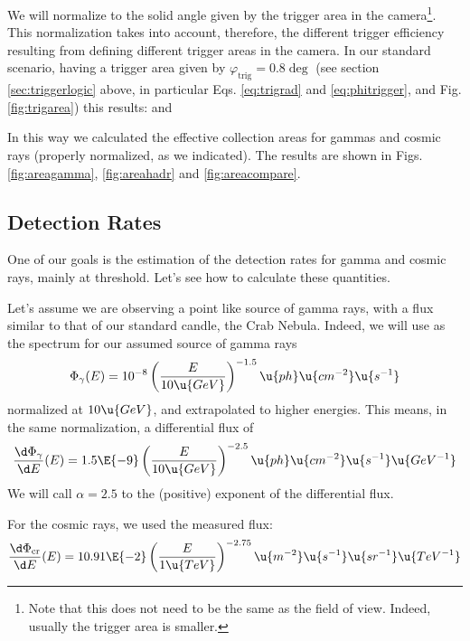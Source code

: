 We will normalize to the solid angle given by the trigger area in the
camera\footnote{ Note that this does not need to be the same as the
  field of view. Indeed, usually the trigger area is smaller.}. This
normalization takes into account, therefore, the different trigger
efficiency resulting from defining different trigger areas in the
camera. In our standard scenario, having a trigger area given by
$\varphi_{\mathrm{trig}} = 0.8\deg$ (see section
\ref{sec:triggerlogic} above, in particular Eqs.  \ref{eq:trigrad} and
\ref{eq:phitrigger}, and Fig. \ref{fig:trigarea}) this results:
%
\normsolidangleeq
%
and 
%
\Scrnormeq

In this way we calculated the effective collection areas for gammas
and cosmic rays (properly normalized, as we indicated). The results
are shown in Figs. \ref{fig:areagamma}, \ref{fig:areahadr} and
\ref{fig:areacompare}.

\MORE%

\subsection{Detection Rates}

One of our goals is the estimation of the detection rates for gamma
and cosmic rays, mainly at threshold. Let's see how to calculate these
quantities.

Let's assume we are observing a point like source of gamma rays, with
a flux similar to that of our standard candle, the Crab Nebula.
Indeed, we will use as the spectrum for our assumed source of gamma
rays
%
\begin{equation}
  \label{eq:gFlux}
  \Phi_\gamma(E) = 
  10^{-8} \left(\frac{E}{10\u{GeV}}\right)^{-1.5} 
  \u{ph}\u{cm^{-2}}\u{s^{-1}}
\end{equation}
%
normalized at $10\u{GeV}$, and extrapolated to higher energies.
This means, in the same normalization, a differential flux of
%
\begin{equation}
  \label{eq:gdFlux}
  \frac{\d\Phi_\gamma}{\d E}(E) = 
  1.5\E{-9} \left(\frac{E}{10\u{GeV}}\right)^{-2.5} 
  \u{ph}\u{cm^{-2}}\u{s^{-1}}\u{GeV^{-1}}
\end{equation}
%
We will call $\alpha=2.5$ to the (positive) exponent of the
differential flux.

For the cosmic rays, we used the measured flux:
%
\begin{equation}
  \label{eq:crFlux}
  \frac{\d\Phi_{\mathrm{cr}}}{\d E}(E) = 
  10.91\E{-2} \left(\frac{E}{1\u{TeV}}\right)^{-2.75} 
  \u{m^{-2}}\u{s^{-1}}\u{sr^{-1}}\u{TeV^{-1}}
\end{equation}

